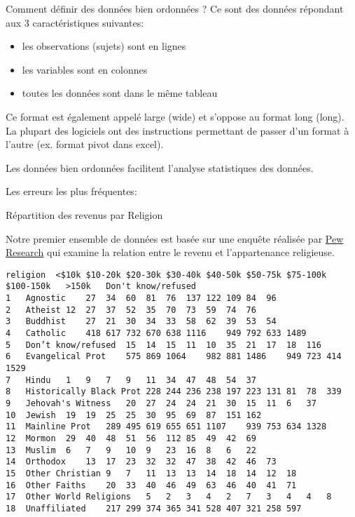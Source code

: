 \documentclass[]{article}
\begin{document}
Comment définir des données bien ordonnées ? Ce sont des données
répondant aux 3 caractéristiques suivantes:

\begin{itemize}
\itemsep1pt\parskip0pt
\item
  les observations (sujets) sont en lignes
\item
  les variables sont en colonnes
\item
  toutes les données sont dans le même tableau
\end{itemize}

Ce format est également appelé large (wide) et s'oppose au format long
(long). La plupart des logiciels ont des instructions permettant de
passer d'un format à l'autre (ex. format pivot dans excel).

Les données bien ordonnées facilitent l'analyse statistiques des
données.

Les erreurs les plus fréquentes:

Répartition des revenus par Religion

Notre premier ensemble de données est basée sur une enquête réalisée par
\href{http://www.pewforum.org/2009/01/30/income-distribution-within-us-religious-groups/}{Pew
Research} qui examine la relation entre le revenu et l'appartenance
religieuse.

\begin{verbatim}
religion  <$10k $10-20k $20-30k $30-40k $40-50k $50-75k $75-100k    $100-150k   >150k   Don't know/refused
1   Agnostic    27  34  60  81  76  137 122 109 84  96
2   Atheist 12  27  37  52  35  70  73  59  74  76
3   Buddhist    27  21  30  34  33  58  62  39  53  54
4   Catholic    418 617 732 670 638 1116    949 792 633 1489
5   Don’t know/refused  15  14  15  11  10  35  21  17  18  116
6   Evangelical Prot    575 869 1064    982 881 1486    949 723 414 1529
7   Hindu   1   9   7   9   11  34  47  48  54  37
8   Historically Black Prot 228 244 236 238 197 223 131 81  78  339
9   Jehovah's Witness   20  27  24  24  21  30  15  11  6   37
10  Jewish  19  19  25  25  30  95  69  87  151 162
11  Mainline Prot   289 495 619 655 651 1107    939 753 634 1328
12  Mormon  29  40  48  51  56  112 85  49  42  69
13  Muslim  6   7   9   10  9   23  16  8   6   22
14  Orthodox    13  17  23  32  32  47  38  42  46  73
15  Other Christian 9   7   11  13  13  14  18  14  12  18
16  Other Faiths    20  33  40  46  49  63  46  40  41  71
17  Other World Religions   5   2   3   4   2   7   3   4   4   8
18  Unaffiliated    217 299 374 365 341 528 407 321 258 597
\end{verbatim}
\end{document}
